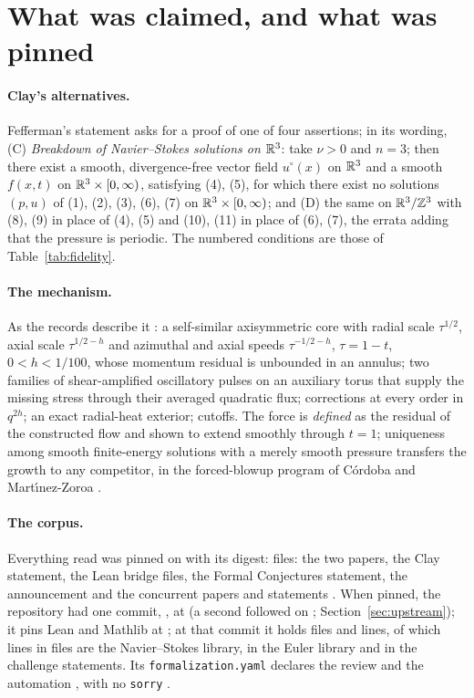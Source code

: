 \documentclass[11pt]{article}
\newcommand{\lean}[1]{\texttt{#1}}
\begin{document}
\section{What was claimed, and what was pinned}\label{sec:claim}

\paragraph{Clay's alternatives.} Fefferman's statement \cite{Fef00} asks for a proof of one
of four assertions; in its wording, (C) \emph{Breakdown of Navier--Stokes solutions on
$\mathbb{R}^3$}: take $\nu>0$ and $n=3$; then there exist a smooth, divergence-free vector field
$u^\circ(x)$ on $\mathbb{R}^3$ and a smooth $f(x,t)$ on $\mathbb{R}^3\times[0,\infty)$, satisfying (4), (5),
for which there exist no solutions $(p,u)$ of (1), (2), (3), (6), (7) on
$\mathbb{R}^3\times[0,\infty)$; and (D) the same on $\mathbb{R}^3/\mathbb{Z}^3$ with (8), (9) in place of (4), (5)
and (10), (11) in place of (6), (7), the errata adding that the pressure is periodic. The
numbered conditions are those of Table~\ref{tab:fidelity}.

\paragraph{The mechanism.} As the records describe it \cite{Records}: a self-similar
axisymmetric core with radial scale $\tau^{1/2}$, axial scale $\tau^{1/2-h}$ and azimuthal
and axial speeds $\tau^{-1/2-h}$, $\tau=1-t$, $0<h<1/100$, whose momentum residual is
unbounded in an annulus; two families of shear-amplified oscillatory pulses on an auxiliary
torus that supply the missing stress through their averaged quadratic flux; corrections at
every order in $q^{2h}$; an exact radial-heat exterior; cutoffs. The force is
\emph{defined} as the residual of the constructed flow and shown to extend smoothly through
$t=1$; uniqueness among smooth finite-energy solutions with a merely smooth pressure
transfers the growth to any competitor, in the forced-blowup program of C\'ordoba and
Mart\'{\i}nez-Zoroa \cite{CMZ}.

\paragraph{The corpus.} Everything read was pinned on \CorpusFetched{} with its digest:
\CorpusFiles{} files: the two papers, the Clay statement, the Lean bridge files, the Formal
Conjectures statement, the announcement and the concurrent papers and statements \cite{OAINS,OAIE,OAIann,OAIrepo,FC,AB}. When
pinned, the repository \cite{OAIrepo} had one commit, \lean{\LeanCommit}, at \LeanCommitDate{}
\LeanCommitTime{} (a second followed on \UpCommitDate; Section~\ref{sec:upstream}); it pins Lean \LeanToolchain{} \cite{LeanMathlib} and Mathlib at \lean{\MathlibRev}
\cite{LeanMathlib}; at that commit it holds \LeanFiles{} files and \LeanLines{} lines, of which \NSLines{} lines
in \NSFiles{} files are the Navier--Stokes library, \EulerLines{} in \EulerFiles{} the Euler
library and \ChalLines{} in \ChalFiles{} the challenge statements. Its
\lean{formalization.yaml} declares the review \emph{\FormalReview} and the automation
\emph{\FormalAutomation}, with no \lean{sorry} \cite{Records}.
\end{document}
